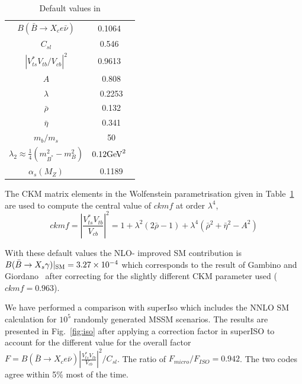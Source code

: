 \documentclass[12pt,a4paper]{article}
\begin{document}
\begin{table}[htbp]
\begin{center}
\begin{tabular}{|c|c|}
\hline
$B(\bar{B}\rightarrow X_c e\bar\nu)$ & 0.1064~\cite{Nakamura:2010zzi}\\
$C_{sl}$ & 0.546~\cite{Gambino:2008fj}\\
$|V_{ts}^*V_{tb}/V_{cb}|^2$ & 0.9613~\cite{Nakamura:2010zzi}\\
$A$& 0.808\\
$\lambda$ & 0.2253\\
$\bar{\rho}$ & 0.132\\
$\bar{\eta}$ &0.341 \\
$m_b/m_s$  & 50\\
$\lambda_2\approx \frac{1}{4} (m^2_{B^*}-m^2_B)$ &  $0.12 {\rm GeV}^2$~\cite{Yao:2006px}\\
$\alpha_s(M_Z)$ &0.1189 \\\hline
\end{tabular}
\caption{Default values in \micro }
\label{tab:def}
\end{center}
\end{table}

The CKM matrix elements in the Wolfenstein parametrisation given in Table~\ref{tab:def}
are used to compute the central value of $ckmf$  at order $\lambda^4$,
\begin{equation}
ckmf=\left|\frac{V_{ts}^*V_{tb}}{V_{cb}}\right|^2=1+\lambda^2 (2\bar{\rho}-1) +
\lambda^4 (\bar\rho^2+\bar\eta^2-A^2)
\end{equation}

With these default values  the NLO- improved SM contribution 
is $B(\bar{B}\rightarrow X_s \gamma)|_{\rm SM}=3.27\times 10^{-4}$ which corresponds to the result of Gambino
and Giordano~\cite{Gambino:2008fj} after correcting for the slightly different CKM parameter used ($ckmf=0.963$).

We have performed a comparison with superIso which includes the NNLO SM calculation for 
$10^5$ randomly generated MSSM scenarios. The results are presented in Fig.~\ref{fig:iso}  after applying a
correction factor in superISO to account for the different value for the overall factor
$F=B(\bar{B}\rightarrow X_c e\bar\nu) \left|\frac{V_{ts}^* V_{tb}}
{V_{cb}}\right|^2/C_{sl}$. The ratio of $F_{micro}/F_{ISO}=0.942$.
The two codes agree within 5\% most of the time. 
\end{document}
